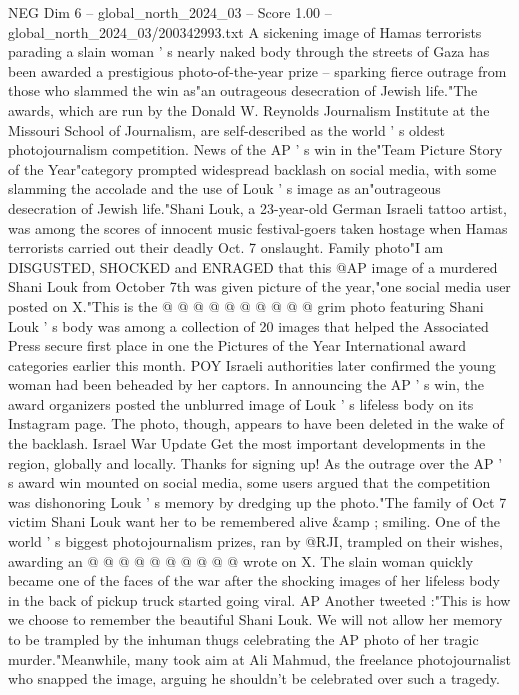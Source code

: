 \begin{textsample}{NEG Dim 6 – global\_north\_2024\_03 – Score 1.00 – global\_north\_2024\_03/200342993.txt}  \label{ex:f6_neg_400}
A sickening image of Hamas terrorists parading a slain woman ' s nearly naked body through the streets of Gaza has been awarded a prestigious photo-of-the-year prize -- sparking fierce outrage from those who slammed the win as"an outrageous desecration of Jewish life."The awards, which are run by the Donald W.
Reynolds Journalism Institute at the Missouri School of Journalism, are self-described as the world ' s oldest photojournalism competition.
News of the AP ' s win in the"Team Picture Story of the Year"category prompted widespread backlash on social media, with some slamming the accolade and the use of Louk ' s image as an"outrageous desecration of Jewish life."Shani Louk, a 23-year-old German Israeli tattoo artist, was among the scores of innocent music festival-goers taken hostage when Hamas terrorists carried out their deadly Oct. 7 onslaught.
Family photo"I am DISGUSTED, SHOCKED and ENRAGED that this @AP image of a murdered Shani Louk from October 7th was given picture of the year,"one social media user posted on X."This is the @ @ @ @ @ @ @ @ @ @ grim photo featuring Shani Louk ' s body was among a collection of 20 images that helped the Associated Press secure first place in one the Pictures of the Year International award categories earlier this month.
POY Israeli authorities later confirmed the young woman had been beheaded by her captors.
In announcing the AP ' s win, the award organizers posted the unblurred image of Louk ' s lifeless body on its Instagram page.
The photo, though, appears to have been deleted in the wake of the backlash.
Israel War Update Get the most important developments in the region, globally and locally.
Thanks for signing up!
As the outrage over the AP ' s award win mounted on social media, some users argued that the competition was dishonoring Louk ' s memory by dredging up the photo."The family of Oct 7 victim Shani Louk want her to be remembered alive \&amp ; smiling.
One of the world ' s biggest photojournalism prizes, ran by @RJI, trampled on their wishes, awarding an @ @ @ @ @ @ @ @ @ @ wrote on X.
The slain woman quickly became one of the faces of the war after the shocking images of her lifeless body in the back of pickup truck started going viral.
AP Another tweeted :"This is how we choose to remember the beautiful Shani Louk.
We will not allow her memory to be trampled by the inhuman thugs celebrating the AP photo of her tragic murder."Meanwhile, many took aim at Ali Mahmud, the freelance photojournalist who snapped the image, arguing he shouldn't be celebrated over such a tragedy.

\end{textsample}
